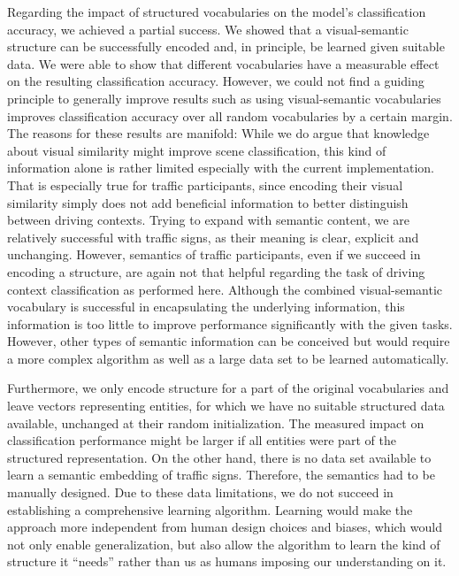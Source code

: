 Regarding the impact of structured vocabularies on the model's classification accuracy, we achieved a partial success.
We showed that a visual-semantic structure can be successfully encoded and, in principle, be learned given suitable data.
We were able to show that different vocabularies have a measurable effect on the resulting classification accuracy.
However, we could not find a guiding principle to generally improve results such as using visual-semantic vocabularies improves classification accuracy over all random vocabularies by a certain margin.
The reasons for these results are manifold:
While we do argue that knowledge about visual similarity might improve scene classification, this kind of information alone is rather limited especially with the current implementation.
That is especially true for traffic participants, since encoding their visual similarity simply does not add beneficial information to better distinguish between driving contexts.
Trying to expand with semantic content, we are relatively successful with traffic signs, as their meaning is clear, explicit and unchanging.
However, semantics of traffic participants, even if we succeed in encoding a structure, are again not that helpful regarding the task of driving context classification as performed here.
Although the combined visual-semantic vocabulary is successful in encapsulating the underlying information, this information is too little to improve performance significantly with the given tasks.
However, other types of semantic information can be conceived but would require a more complex algorithm as well as a large data  set to be learned automatically.

Furthermore, we only encode structure for a part of the original vocabularies and leave vectors representing entities, for which we have no suitable structured data available, unchanged at their random initialization.
The measured impact on classification performance might be larger if all entities were part of the structured representation.
On the other hand, there is no data set available to learn a semantic embedding of traffic signs.
Therefore, the semantics had to be manually designed.
Due to these data limitations, we do not succeed in establishing a comprehensive learning algorithm.
Learning would make the approach more independent from human design choices and biases, which would not only enable generalization, but also allow the algorithm to learn the kind of structure it \enquote{needs} rather than us as humans imposing our understanding on it.

